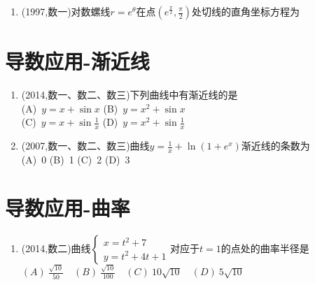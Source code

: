 \documentclass[12pt, a4paper, oneside, UTF8]{ctexbook}
\begin{document}
\begin{enumerate}[label=\arabic*.,start=12]
    \item  (1997,数一)对数螺线$r=e^\theta$在点$(e^\frac{\pi}{2},\frac{\pi}{2})$处切线的直角坐标方程为\underline{\quad}
    
    \begin{solution}
    
    \end{solution}
\end{enumerate}

\section{导数应用-渐近线}

\begin{enumerate}[label=\arabic*.,start=13]
    \item  (2014,数一、数二、数三)下列曲线中有渐近线的是 \\
        (A)\ $y=x+\sin x$ \qquad (B)\ $y=x^2+\sin x$ \\
        (C)\ $y=x+\sin\frac{1}{x}$ \qquad (D)\ $y=x^2+\sin\frac{1}{x}$
    
    \begin{solution}
    
    \end{solution}
    
    \item  (2007,数一、数二、数三)曲线$y=\frac{1}{x}+\ln(1+e^x)$渐近线的条数为 \\
        (A)\ 0 \qquad (B)\ 1 \qquad (C)\ 2 \qquad (D)\ 3
    
    \begin{solution}
    
    \end{solution}
\end{enumerate}

\section{导数应用-曲率}

\begin{enumerate}[label=\arabic*.,start=15]
    \item  (2014,数二)曲线$\begin{cases}
        x=t^2+7 \\
        y=t^2+4t+1
    \end{cases}$对应于$t=1$的点处的曲率半径是 \\
        $(A)\ \frac{\sqrt{10}}{50} \quad (B)\ 
        \frac{\sqrt{10}}{100} \quad (C)\ 10\sqrt{10} \quad (D)\ 5\sqrt{10}$
    
    \begin{solution}
    
    \end{solution}
\end{enumerate}
\end{document}

